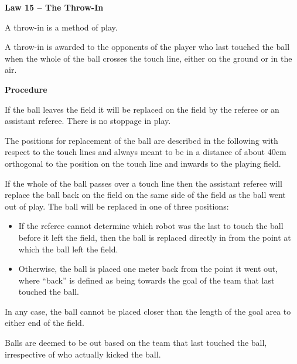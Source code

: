 \clearpage
\sffamily
{\bfseries
\textcolor[rgb]{0.4,0.4,0.4}{Law 15 -- The Throw-In} }
{}


\bigskip

A throw-in is a method of   play.

\bigskip

A throw-in is awarded to the opponents of the player who last touched
the ball when the whole of the ball crosses the touch line, either on
the ground or in the air.

\bigskip


\bigskip

{\bfseries Procedure }

\headlinebox 

If the ball leaves the field it will be replaced on the field by the
referee or an assistant referee. There is no stoppage in play.

The positions for replacement of the ball are described in the
following with respect to the touch lines and always meant to be in a
distance of about 40cm orthogonal to the position on the touch line and
inwards to the playing field. 

If the whole of the ball passes over a touch line then the assistant
referee will replace the ball back on the field on the same side of the
field as the ball went out of play. The ball will be replaced in one of
three positions: 

\begin{itemize}
\item If the referee cannot determine which robot was the last to touch
the ball before it left the field, then the ball is replaced directly
in from the point at which the ball left the field. 
\item Otherwise, the ball is placed one meter back from the point it
went out, where ``back'' is defined as being towards the goal of the team that last touched the ball. 
\end{itemize}

In any case, the ball cannot be placed closer than the length of the
goal area to either end of the field. 

Balls are deemed to be out based on the team that last touched the ball,
irrespective of who actually kicked the ball.

